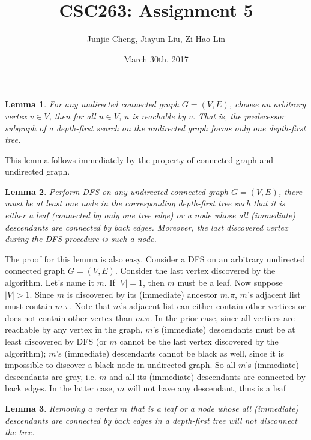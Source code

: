 \documentclass[11pt, answers]{exam}
\theoremstyle{plain}
\newtheorem{lemma}{Lemma}
\theoremstyle{definition}
\begin{document}
\title{CSC263: Assignment 5}
\date{March 30th, 2017}
\author{Junjie Cheng, Jiayun Liu, Zi Hao Lin}
\maketitle

\unframedsolutions

\begin{questions}
\question
\begin{solution}
\begin{lemma}
For any undirected connected graph $G=(V,E)$, choose an arbitrary vertex $v \in V$, then for all $u \in V$, $u$ is reachable by $v$. That is, the predecessor subgraph of a depth-first search on the undirected graph forms only one depth-first tree.
\end{lemma}
This lemma follows immediately by the property of connected graph and undirected graph.
\begin{lemma}
Perform DFS on any undirected connected graph $G=(V,E)$, there must be at least one node in the corresponding depth-first tree such that it is either a leaf (connected by only one tree edge) or a node whose all (immediate) descendants are connected by back edges. Moreover, the last discovered vertex during the DFS procedure is such a node.
\end{lemma}
The proof for this lemma is also easy. Consider a DFS on an arbitrary undirected connected graph $G=(V,E)$. Consider the last vertex discovered by the algorithm. Let's name it $m$. If $|V| = 1$, then $m$ must be a leaf. Now suppose $|V|>1$. Since $m$ is discovered by its (immediate) ancestor $m.\pi$, $m$'s adjacent list must contain $m.\pi$. Note that $m$'s adjacent list can either contain other vertices or does not contain other vertex than $m.\pi$. In the prior case, since all vertices are reachable by any vertex in the graph, $m$'s (immediate) descendants must be at least discovered by DFS (or $m$ cannot be the last vertex discovered by the algorithm); $m$'s (immediate) descendants cannot be black as well, since it is impossible to discover a black node in undirected graph. So all $m$'s (immediate) descendants are gray, i.e. $m$ and all its (immediate) descendants are connected by back edges. In the latter case, $m$ will not have any descendant, thus is a leaf
\begin{lemma}
Removing a vertex $m$ that is a leaf or a node whose all (immediate) descendants are connected by back edges in a depth-first tree will not disconnect the tree. 
\end{lemma}

\end{solution}
\end{questions}
\end{document}

